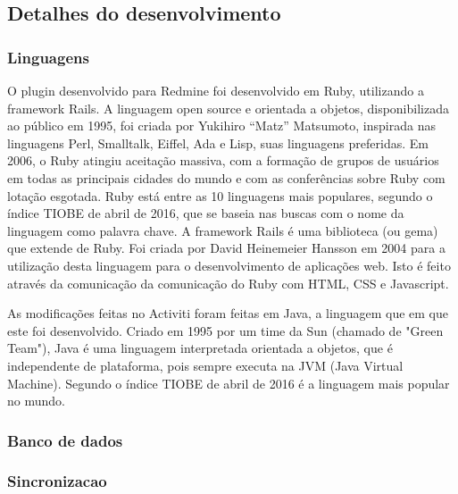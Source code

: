 \subsection{Detalhes do desenvolvimento}\label{sec:integracao_redmine_activiti_implementacao_detalhes_desenvolvimento}

\subsubsection{Linguagens}\label{sec:integracao_redmine_activiti_implementacao_detalhes_desenvolvimento_linguagens}

O plugin desenvolvido para Redmine foi desenvolvido em Ruby\cite{ruby-lang}, utilizando a framework Rails\cite{rails}. A linguagem open source e orientada a objetos, disponibilizada ao público em 1995, foi criada por Yukihiro “Matz” Matsumoto, inspirada nas linguagens Perl, Smalltalk, Eiffel, Ada e Lisp, suas linguagens preferidas. Em 2006, o Ruby atingiu aceitação massiva, com a formação de grupos de usuários em todas as principais cidades do mundo e com as conferências sobre Ruby com lotação esgotada. Ruby está entre as 10 linguagens mais populares, segundo o índice TIOBE\cite{tiobe} de abril de 2016, que se baseia nas buscas com o nome da linguagem como palavra chave. A framework Rails é uma biblioteca (ou gema) que extende de Ruby. Foi criada por David Heinemeier Hansson em 2004 para a utilização desta linguagem para o desenvolvimento de aplicações web. Isto é feito através da comunicação da comunicação do Ruby com HTML, CSS e Javascript.

As modificações feitas no Activiti foram feitas em Java, a linguagem que em que este foi desenvolvido. Criado em 1995 por um time da Sun (chamado de "Green Team"), Java\cite{java-history} é uma linguagem interpretada orientada a objetos,  que é independente de plataforma, pois sempre executa na JVM (Java Virtual Machine). Segundo o índice TIOBE de abril de 2016 é a linguagem mais popular no mundo.

\subsubsection{Banco de dados}\label{sec:integracao_redmine_activiti_implementacao_detalhes_desenvolvimento_bd}

\subsubsection{Sincronizacao}\label{sec:integracao_redmine_activiti_implementacao_detalhes_desenvolvimento_sincronizacao}

